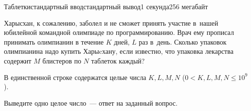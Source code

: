 \begin{problem}{Таблетки}{стандартный ввод}{стандартный вывод}{1 секунда}{256 мегабайт}

Харысхан, к сожалению, заболел и не сможет принять участие в~нашей юбилейной командной олимпиаде по программированию. Врач ему прописал принимать олимпианин в течение $K$ дней, $L$ раз в~день. Сколько упаковок олимпианина надо купить Харыcхану, если известно, что упаковка лекарства содержит $M$ блистеров по $N$ таблеток каждый?

\InputFile
В единственной строке содержатся целые числа $K, L, M, N$ ($0<K,L,M,N\leq 10^9$). 

\OutputFile
Выведите одно целое число~--- ответ на заданный вопрос.

\Example

\begin{example}
%
\end{example}

\end{problem}

